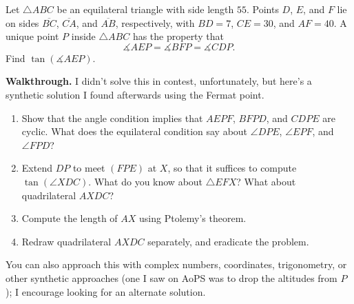 \documentclass{scrartcl}
\providecommand{\ii}{\item}
\newenvironment{walkthrough}{\noindent\textbf{Walkthrough.}}{}
\begin{document}
\begin{example}[2023 AIME I/12]
	Let $\triangle ABC$ be an equilateral triangle with side length $55$.
	Points $D$, $E$, and $F$ lie on sides $\overline{BC}$, $\overline{CA}$,
	and $\overline{AB}$, respectively, with $BD=7$, $CE=30$, and $AF=40$.
	A unique point $P$ inside $\triangle ABC$ has the property that
	\[\measuredangle AEP=\measuredangle BFP=\measuredangle CDP.\]
	Find $\tan\left(\measuredangle AEP\right)$.
\end{example}
\begin{walkthrough}
	I didn't solve this in contest, unfortunately, but here's a
	synthetic solution I found afterwards using the Fermat point.
	\begin{enumerate}[label=\textbf{(\alph*)}]
		\ii Show that the angle condition implies that
		$AEPF$, $BFPD$, and $CDPE$ are cyclic.
		What does the equilateral condition say about
		$\angle DPE$, $\angle EPF$, and $\angle FPD$?
		\ii Extend $DP$ to meet $(FPE)$ at $X$, so that it suffices to compute
		$\tan(\angle XDC)$. What do you know about $\triangle EFX$?
		What about quadrilateral $AXDC$?
		\ii Compute the length of $AX$ using Ptolemy's theorem.
		\ii Redraw quadrilateral $AXDC$ separately, and eradicate the problem.
	\end{enumerate}
	
	You can also approach this with complex numbers, coordinates, trigonometry,
	or other synthetic approaches
	(one I saw on AoPS was to drop the altitudes from $P$);
	I encourage looking for an alternate solution.
\end{walkthrough}
\end{document}
